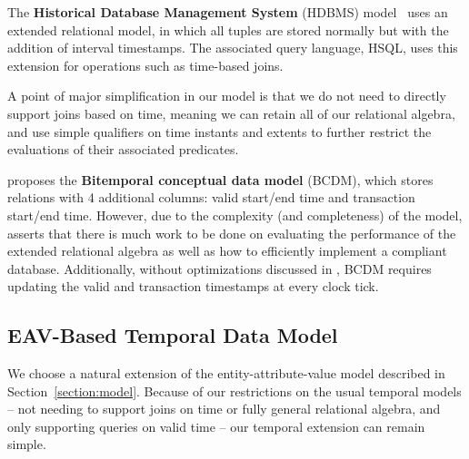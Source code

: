 
The \textbf{Historical Database Management System} (HDBMS)
model~\cite{sarda1990extensions} uses an extended relational model, in which
all tuples are stored normally but with the addition of interval timestamps.
The associated query language, HSQL, uses this extension for operations such as
time-based joins.

A point of major simplification in our model is that we do not need to directly
support joins based on time, meaning we can retain all of our relational
algebra, and use simple qualifiers on time instants and extents to further
restrict the evaluations of their associated predicates.

\cite{jensen1994unifying} proposes the \textbf{Bitemporal conceptual data
model} (BCDM), which stores relations with 4 additional columns: valid
start/end time and transaction start/end time. However, due to the complexity
(and completeness) of the model, \cite{jensen1999temporal} asserts that there
is much work to be done on evaluating the performance of the extended
relational algebra as well as how to efficiently implement a compliant
database. Additionally, without optimizations discussed in
\cite{jensen1999temporal}, BCDM requires updating the valid and transaction
timestamps at every clock tick.


\subsection{EAV-Based Temporal Data Model}

We choose a natural extension of the entity-attribute-value model described in Section~\ref{section:model}.
Because of our restrictions on the usual temporal models -- not needing to support joins on time or fully
general relational algebra, and only supporting queries on valid time -- our temporal extension can remain
simple.

